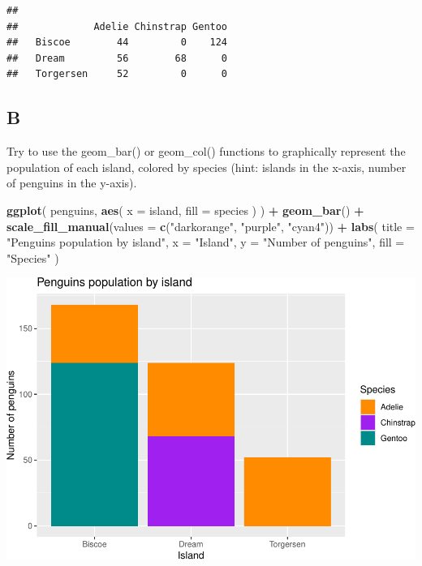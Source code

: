 \documentclass[
]{article}
\newenvironment{Shaded}{\begin{snugshade}}{\end{snugshade}}
\newcommand{\DataTypeTok}[1]{\textcolor[rgb]{0.13,0.29,0.53}{#1}}
\newcommand{\KeywordTok}[1]{\textcolor[rgb]{0.13,0.29,0.53}{\textbf{#1}}}
\newcommand{\NormalTok}[1]{#1}
\newcommand{\OperatorTok}[1]{\textcolor[rgb]{0.81,0.36,0.00}{\textbf{#1}}}
\newcommand{\StringTok}[1]{\textcolor[rgb]{0.31,0.60,0.02}{#1}}
\begin{document}
\begin{verbatim}
##            
##             Adelie Chinstrap Gentoo
##   Biscoe        44         0    124
##   Dream         56        68      0
##   Torgersen     52         0      0
\end{verbatim}

\hypertarget{b-4}{%
\subsection{B}\label{b-4}}

Try to use the geom\_bar() or geom\_col() functions to graphically
represent the population of each island, colored by species (hint:
islands in the x-axis, number of penguins in the y-axis).

\begin{Shaded}
\begin{Highlighting}[]
\KeywordTok{ggplot}\NormalTok{(}
\NormalTok{  penguins,}
  \KeywordTok{aes}\NormalTok{(}
    \DataTypeTok{x =}\NormalTok{ island,}
    \DataTypeTok{fill =}\NormalTok{ species}
\NormalTok{  )}
\NormalTok{) }\OperatorTok{+}
\StringTok{  }\KeywordTok{geom\_bar}\NormalTok{() }\OperatorTok{+}
\StringTok{  }\KeywordTok{scale\_fill\_manual}\NormalTok{(}\DataTypeTok{values =} \KeywordTok{c}\NormalTok{(}\StringTok{"darkorange"}\NormalTok{, }\StringTok{"purple"}\NormalTok{, }\StringTok{"cyan4"}\NormalTok{)) }\OperatorTok{+}
\StringTok{  }\KeywordTok{labs}\NormalTok{(}
    \DataTypeTok{title =} \StringTok{"Penguins population by island"}\NormalTok{,}
    \DataTypeTok{x =} \StringTok{"Island"}\NormalTok{,}
    \DataTypeTok{y =} \StringTok{"Number of penguins"}\NormalTok{,}
    \DataTypeTok{fill =} \StringTok{"Species"}
\NormalTok{  )}
\end{Highlighting}
\end{Shaded}

\includegraphics{es_files/figure-latex/unnamed-chunk-18-1.pdf}
\end{document}
